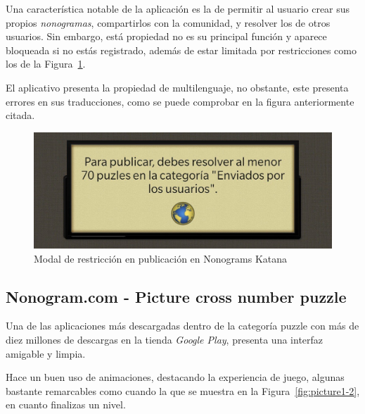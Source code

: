  Una característica notable de la aplicación es la de permitir al usuario crear sus propios \textit{nonogramas}, compartirlos con la comunidad, y resolver los de
 otros usuarios. Sin embargo, está propiedad no es su principal función y aparece bloqueada si no estás registrado, además de estar limitada por restricciones como los de la 
 Figura~\ref{fig:katana3}.

 El aplicativo presenta la propiedad de multilenguaje, no obstante, este presenta errores en sus traducciones, como se puede comprobar en la figura anteriormente
 citada.

 \begin{figure}[H]
   \centering
   \includegraphics[scale=.175]{images/nonokatana4.jpg}
   \caption{Modal de restricción en publicación en Nonograms Katana}
   \label{fig:katana3}
 \end{figure}
 

\subsection{Nonogram.com - Picture cross number puzzle}

Una de las aplicaciones más descargadas dentro de la categoría puzzle con más de diez millones de descargas en la tienda \textit{Google Play}, 
presenta una interfaz amigable y limpia.

Hace un buen uso de animaciones, destacando la experiencia de juego, algunas bastante remarcables como cuando la que se muestra en la 
Figura~\ref{fig:picture1-2}, en cuanto finalizas un nivel.

